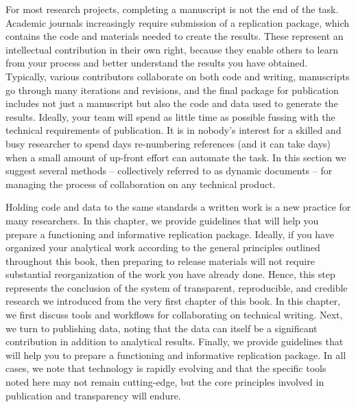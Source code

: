 
\begin{fullwidth}
For most research projects, completing a manuscript is not the end of the task.
Academic journals increasingly require submission of a replication package,
which contains the code and materials needed to create the results.
These represent an intellectual contribution in their own right,
because they enable others to learn from your process
and better understand the results you have obtained.
Typically, various contributors collaborate on both code and writing,
manuscripts go through many iterations and revisions,
and the final package for publication includes not just a manuscript
but also the code and data used to generate the results.
Ideally, your team will spend as little time as possible
fussing with the technical requirements of publication.
It is in nobody's interest for a skilled and busy researcher
to spend days re-numbering references (and it can take days)
when a small amount of up-front effort can automate the task.
In this section we suggest several methods --
collectively referred to as dynamic documents --
for managing the process of collaboration on any technical product.

Holding code and data to the same standards a written work
is a new practice for many researchers.
In this chapter, we provide guidelines that will help you
prepare a functioning and informative replication package.
Ideally, if you have organized your analytical work
according to the general principles outlined throughout this book,
then preparing to release materials will not require
substantial reorganization of the work you have already done.
Hence, this step represents the conclusion of the system
of transparent, reproducible, and credible research we introduced
from the very first chapter of this book.
In this chapter, we first discuss tools and workflows for collaborating on technical writing.
Next, we turn to publishing data,
noting that the data can itself be a significant contribution in addition to analytical results.
Finally, we provide guidelines that will help you to prepare a functioning and informative replication package.
In all cases, we note that technology is rapidly evolving
and that the specific tools noted here may not remain cutting-edge,
but the core principles involved in publication and transparency will endure.
\end{fullwidth}


